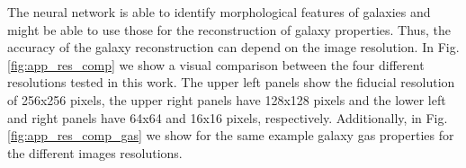 \documentclass[useAMS,usenatbib]{mnras}
\begin{document}
The neural network is able to identify morphological features of galaxies and might be able to use those for the reconstruction of galaxy properties. Thus, the accuracy of the galaxy reconstruction can depend on the image resolution. In Fig. \ref{fig:app_res_comp} we show a visual comparison between the four different resolutions tested in this work. The upper left panels show the fiducial resolution of 256x256 pixels, the upper right panels have 128x128 pixels and the lower left and right panels have 64x64 and 16x16 pixels, respectively. Additionally, in Fig. \ref{fig:app_res_comp_gas} we show for the same example galaxy gas properties for the different images resolutions.

% 
%
%


\label{lastpage}
\end{document}
